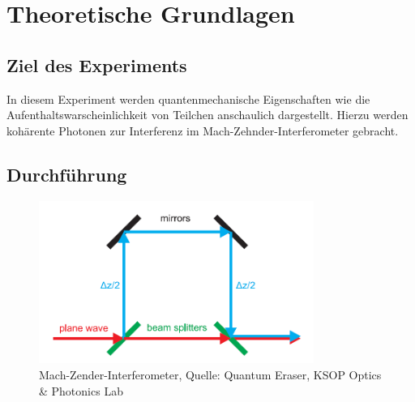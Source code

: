 \documentclass{include/thesisclass3}
\begin{document}
	\FrontMatter
	
	\tableofcontents                  
	\newpage
	\MainMatter


\chapter{Theoretische Grundlagen}

\section{Ziel des Experiments}

In diesem Experiment werden quantenmechanische Eigenschaften wie die Aufenthaltswarscheinlichkeit von Teilchen anschaulich dargestellt. Hierzu werden kohärente Photonen zur Interferenz im Mach-Zehnder-Interferometer gebracht. 

\section{Durchführung}
\begin{figure}[H]
	\begin{center}
		\includegraphics[width=0.8\textwidth]{images/Beamsplit.png}
		\caption{Mach-Zender-Interferometer, Quelle: Quantum Eraser, KSOP Optics \& Photonics Lab}
		\label{Mach-Zehnder}
	\end{center}
\end{figure}
\end{document}
